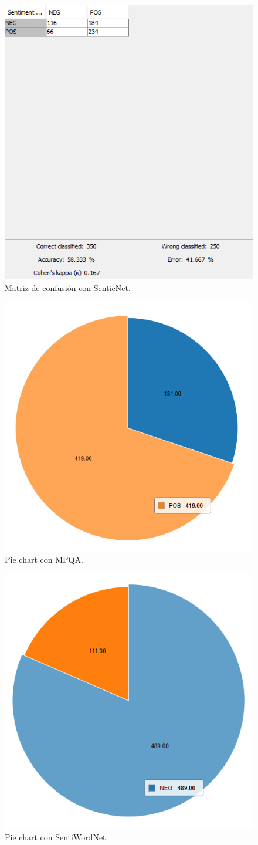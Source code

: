 \begin{figure}[H]
    \center\includegraphics[width=.95\linewidth]{img/analysis/score3.png}
    \caption{Matriz de confusión con SenticNet.}
\end{figure}

\newpage

\begin{figure}[H]
    \center\includegraphics[height=.4\linewidth]{img/analysis/pie1.png}
    \caption{Pie chart con MPQA.}
\end{figure}

\begin{figure}[H]
    \center\includegraphics[height=.4\linewidth]{img/analysis/pie2.png}
    \caption{Pie chart con SentiWordNet.}
\end{figure}

